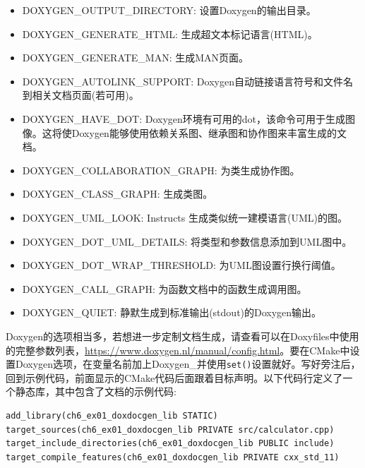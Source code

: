 \begin{itemize}
\item 
DOXYGEN\_OUTPUT\_DIRECTORY: 设置Doxygen的输出目录。

\item 
DOXYGEN\_GENERATE\_HTML: 生成超文本标记语言(HTML)。

\item 
DOXYGEN\_GENERATE\_MAN: 生成MAN页面。

\item 
DOXYGEN\_AUTOLINK\_SUPPORT: Doxygen自动链接语言符号和文件名到相关文档页面(若可用)。

\item 
DOXYGEN\_HAVE\_DOT: Doxygen环境有可用的dot，该命令可用于生成图像。这将使Doxygen能够使用依赖关系图、继承图和协作图来丰富生成的文档。

\item 
DOXYGEN\_COLLABORATION\_GRAPH: 为类生成协作图。

\item 
DOXYGEN\_CLASS\_GRAPH: 生成类图。

\item 
DOXYGEN\_UML\_LOOK: Instructs 生成类似统一建模语言(UML)的图。

\item 
DOXYGEN\_DOT\_UML\_DETAILS: 将类型和参数信息添加到UML图中。

\item 
DOXYGEN\_DOT\_WRAP\_THRESHOLD: 为UML图设置行换行阈值。

\item 
DOXYGEN\_CALL\_GRAPH: 为函数文档中的函数生成调用图。

\item 
DOXYGEN\_QUIET: 静默生成到标准输出(stdout)的Doxygen输出。
\end{itemize}

Doxygen的选项相当多，若想进一步定制文档生成，请查看可以在Doxyfiles中使用的完整参数列表，\url{https://www.doxygen.nl/manual/config.html}。要在CMake中设置Doxygen选项，在变量名前加上Doxygen\_并使用\texttt{set()}设置就好。写好旁注后，回到示例代码，前面显示的CMake代码后面跟着目标声明。以下代码行定义了一个静态库，其中包含了文档的示例代码:

\begin{lstlisting}[style=styleCMake]
add_library(ch6_ex01_doxdocgen_lib STATIC)
target_sources(ch6_ex01_doxdocgen_lib PRIVATE src/calculator.cpp)
target_include_directories(ch6_ex01_doxdocgen_lib PUBLIC include)
target_compile_features(ch6_ex01_doxdocgen_lib PRIVATE cxx_std_11)
\end{lstlisting}

